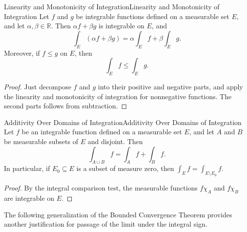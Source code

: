 \documentclass[../main.tex]{subfiles}
\begin{document}
\begin{theorem}{Linearity and Monotonicity of Integration}{Linearity and Monotonicity of Integration}
	Let $f$ and $g$ be integrable functions defined on a measurable set $E$, and let $\alpha, \beta \in \mathbb{R}$. Then $\alpha f + \beta g$ is integrable on $E$, and
	\begin{equation}
		\int_E (\alpha f + \beta g) = \alpha \int_E f + \beta \int_E g.
	\end{equation}
	Moreover, if $f \leq g$ on $E$, then
	\begin{equation}
		\int_E f \leq \int_E g.
	\end{equation}
\end{theorem}
\begin{proof}
	Just decompose $f$ and $g$ into their positive and negative parts, and apply the linearity and monotonicity of integration for nonnegative functions. The second parts follows from subtraction.
\end{proof}

\begin{corollary}{Additivity Over Domains of Integration}{Additivity Over Domains of Integration}
	Let $f$ be an integrable function defined on a measurable set $E$, and let $A$ and $B$ be measurable subsets of $E$ and disjoint. Then
	\begin{equation}
		\int_{A \cup B} f = \int_A f + \int_B f.
	\end{equation}
	In particular, if $E_0 \subseteq E$ is a subset of measure zero, then $\int_E f = \int_{E \setminus E_0} f$.
\end{corollary}
\begin{proof}
	By the integral comparison test, the measurable functions $f \chi_A$ and $f \chi_B$ are integrable on $E$.
\end{proof}

The following generalization of the Bounded Convergence Theorem provides another justification for passage of the limit under the integral sign.
\end{document}
